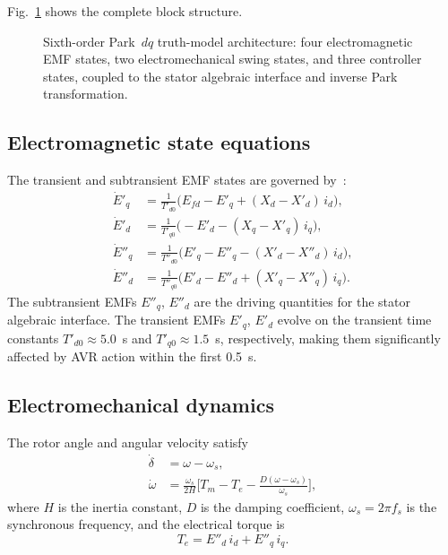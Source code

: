 \documentclass[journal,twoside,letterpaper]{IEEEtran}
\begin{document}
Fig.~\ref{fig:sixthorder_model} shows the complete block
structure.

\begin{figure}[!t]
  \centering
  
  \caption{Sixth-order Park~$dq$ truth-model architecture:
    four electromagnetic EMF states, two electromechanical
    swing states, and three controller states, coupled to the
    stator algebraic interface and inverse Park transformation.}
  \label{fig:sixthorder_model}
\end{figure}

\subsection{Electromagnetic state equations}

The transient and subtransient EMF states are governed
by~\cite{Kundur1994,Anderson1977}:
\begin{align}
  \dot{E}'_q &= \frac{1}{T'_{d0}}\bigl(E_{fd} - E'_q
                + (X_d - X'_d)\,i_d\bigr),
\label{eq:E_q_prime}\\
  \dot{E}'_d &= \frac{1}{T'_{q0}}\bigl(-E'_d
                - (X_q - X'_q)\,i_q\bigr),
\label{eq:E_d_prime}\\
  \dot{E}''_q &= \frac{1}{T''_{d0}}\bigl(E'_q - E''_q
                - (X'_d - X''_d)\,i_d\bigr),
\label{eq:E_q_2prime}\\
  \dot{E}''_d &= \frac{1}{T''_{q0}}\bigl(E'_d - E''_d
                + (X'_q - X''_q)\,i_q\bigr).
\label{eq:E_d_2prime}
\end{align}
The subtransient EMFs $E''_q$, $E''_d$ are the driving
quantities for the stator algebraic interface.
The transient EMFs $E'_q$, $E'_d$ evolve on the transient
time constants $T'_{d0} \approx 5.0$~s and
$T'_{q0} \approx 1.5$~s, respectively, making them
significantly affected by AVR action within the first 0.5~s.

\subsection{Electromechanical dynamics}

The rotor angle and angular velocity satisfy
\begin{align}
  \dot\delta &= \omega - \omega_s, \label{eq:delta}\\
  \dot\omega  &= \frac{\omega_s}{2H}\biggl[T_m - T_e
                - \frac{D(\omega - \omega_s)}{\omega_s}
                \biggr], \label{eq:omega}
\end{align}
where $H$ is the inertia constant, $D$ is the damping
coefficient, $\omega_s = 2\pi f_s$ is the synchronous
frequency, and the electrical torque is
\begin{equation}
  T_e = E''_d\,i_d + E''_q\,i_q. \label{eq:Te}
\end{equation}
\end{document}
